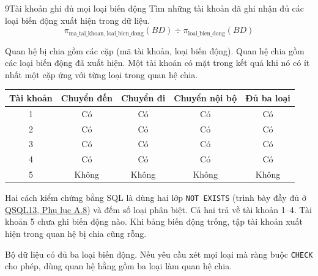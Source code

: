 \begin{racau}{9}{Tài khoản ghi đủ mọi loại biến động}
Tìm những tài khoản đã ghi nhận đủ các loại biến động xuất hiện trong dữ liệu.
\begin{equation*}
\pi_{\text{ma\_tai\_khoan},\ \text{loai\_bien\_dong}}(BD) \div \pi_{\text{loai\_bien\_dong}}(BD)
\end{equation*}

Quan hệ bị chia gồm các cặp (mã tài khoản, loại biến động). Quan hệ chia gồm các loại biến động đã xuất hiện. Một tài khoản có mặt trong kết quả khi nó có ít nhất một cặp ứng với từng loại trong quan hệ chia.

\par\medskip
{\centering
\small
\setlength{\tabcolsep}{4pt}
\captionsetup{hypcap=false}
\renewcommand{\arraystretch}{1.18}
\begin{tabular*}{\linewidth}{@{\extracolsep{\fill}}ccccc@{}}
\hline
\rowcolor{black!7}
\textbf{Tài khoản} & \textbf{Chuyển đến} & \textbf{Chuyển đi} & \textbf{Chuyển nội bộ} & \textbf{Đủ ba loại} \\
\hline
1 & Có   & Có   & Có   & Có \\
2 & Có   & Có   & Có   & Có \\
3 & Có   & Có   & Có   & Có \\
4 & Có   & Có   & Có   & Có \\
5 & Không & Không & Không & Không \\
\hline
\end{tabular*}
\label{tab:ra9-matran}
\par}
\medskip

Hai cách kiểm chứng bằng SQL là dùng hai lớp \texttt{NOT EXISTS} (trình bày đầy đủ ở \hyperref[sec:qsql13-phuluc]{QSQL13, Phụ lục A.8}) và đếm số loại phân biệt. Cả hai trả về tài khoản 1--4. Tài khoản 5 chưa ghi biến động nào. Khi bảng biến động trống, tập tài khoản xuất hiện trong quan hệ bị chia cũng rỗng.

Bộ dữ liệu có đủ ba loại biến động. Nếu yêu cầu xét mọi loại mà ràng buộc \texttt{CHECK} cho phép, dùng quan hệ hằng gồm ba loại làm quan hệ chia.
\end{racau}

